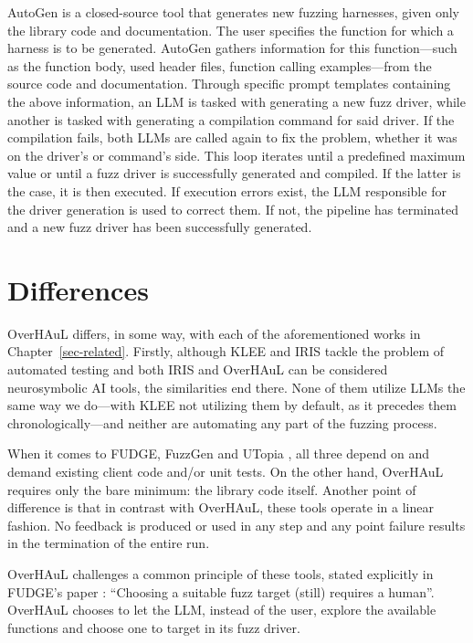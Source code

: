 \documentclass[
  a4paper,
]{scrreprt}
\theoremstyle{definition}
\theoremstyle{remark}
\begin{document}
AutoGen \autocite{sun2024} is a closed-source tool that generates new
fuzzing harnesses, given only the library code and documentation. The
user specifies the function for which a harness is to be generated.
AutoGen gathers information for this function---such as the function
body, used header files, function calling examples---from the source
code and documentation. Through specific prompt templates containing the
above information, an LLM is tasked with generating a new fuzz driver,
while another is tasked with generating a compilation command for said
driver. If the compilation fails, both LLMs are called again to fix the
problem, whether it was on the driver's or command's side. This loop
iterates until a predefined maximum value or until a fuzz driver is
successfully generated and compiled. If the latter is the case, it is
then executed. If execution errors exist, the LLM responsible for the
driver generation is used to correct them. If not, the pipeline has
terminated and a new fuzz driver has been successfully generated.

\section{Differences}\label{sec-differences}

OverHAuL differs, in some way, with each of the aforementioned works in
Chapter~\ref{sec-related}. Firstly, although KLEE and IRIS
\autocite{iris,klee} tackle the problem of automated testing and both
IRIS and OverHAuL can be considered neurosymbolic AI tools, the
similarities end there. None of them utilize LLMs the same way we
do---with KLEE not utilizing them by default, as it precedes them
chronologically---and neither are automating any part of the fuzzing
process.

When it comes to FUDGE, FuzzGen and UTopia
\autocite{utopia,fuzzgen,fudge}, all three depend on and demand existing
client code and/or unit tests. On the other hand, OverHAuL requires only
the bare minimum: the library code itself. Another point of difference
is that in contrast with OverHAuL, these tools operate in a linear
fashion. No feedback is produced or used in any step and any point
failure results in the termination of the entire run.

OverHAuL challenges a common principle of these tools, stated explicitly
in FUDGE's paper \autocite{fudge}: ``Choosing a suitable fuzz target
(still) requires a human''. OverHAuL chooses to let the LLM, instead of
the user, explore the available functions and choose one to target in
its fuzz driver.
\end{document}
